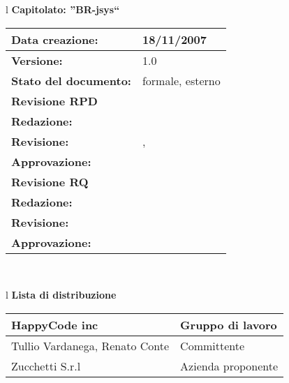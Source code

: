 

\newcommand{\lv}{ 1.0 } %
\newcommand{\dt}{ Specifica Tecnica }%


\begin{center}
\thispagestyle{plain}
\begin{table}[htbp]
\large{
\begin{tabular}{l}
\Large{\textbf{\textsf{Capitolato: ''BR-jsys``}}} \\
\begin{tabular}{|p{6cm}|p{6cm}|} \hline
\textbf{Data creazione:} & 18/11/2007 \\ \hline
\textbf{Versione:} & \lv \\ \hline
\textbf{Stato del documento:} & formale, esterno \\ \hline
\textbf{Revisione RPD} &   \\ \hline
\textbf{Redazione:} & \MB \\ \hline
\textbf{Revisione:} & \AT , \ET  \\ \hline
\textbf{Approvazione:}  & \MM \\ \hline
\textbf{Revisione RQ} &   \\ \hline
\textbf{Redazione:} & \ET \\ \hline
\textbf{Revisione:} & \\ \hline
\textbf{Approvazione:}  & \\ \hline
\end{tabular} \\
\end{tabular}
}
\end{table}
\end{center}

\begin{center}
\begin{table}[hbtp]
\large{
\begin{tabular}{l}
\Large{\textbf{\textsf{Lista di distribuzione}}} \\
\begin{tabular}{|p{6cm}|p{6cm}|} \hline
{HappyCode inc}& Gruppo di lavoro\\ \hline
{Tullio Vardanega, Renato Conte}& Committente \\ \hline 
{Zucchetti S.r.l}& Azienda proponente\\ \hline
\end{tabular} \\
\end{tabular}
}
\end{table}
\end{center}

